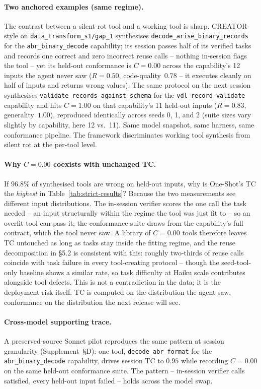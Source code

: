\documentclass[sigconf,anonymous,natbib=false]{acmart}
\begin{document}
\paragraph{Two anchored examples (same regime).}
The contrast between a silent-rot tool and a working tool is sharp. CREATOR-style on \texttt{data\_transform\_s1/gap\_1} synthesises \texttt{decode\_arise\_binary\_records} for the \texttt{abr\_binary\_decode} capability; its session passes half of its verified tasks and records one correct and zero incorrect reuse calls -- nothing in-session flags the tool -- yet its held-out conformance is $C{=}0.00$ across the capability's 12 inputs the agent never saw ($R{=}0.50$, code-quality~$0.78$ -- it executes cleanly on half of inputs and returns wrong values). The same protocol on the next session synthesises \texttt{validate\_records\_against\_schema} for the \texttt{vdl\_record\_validate} capability and hits $C{=}1.00$ on that capability's 11 held-out inputs ($R{=}0.83$, generality~$1.00$), reproduced identically across seeds 0, 1, and 2 (suite sizes vary slightly by capability, here 12 vs.\ 11). Same model snapshot, same harness, same conformance pipeline. The framework discriminates working tool synthesis from silent rot at the per-tool level.

\paragraph{Why $C{=}0.00$ coexists with unchanged TC.}
If $96.8\%$ of synthesised tools are wrong on held-out inputs, why is One-Shot's TC the \emph{highest} in Table~\ref{tab:strict-results}? Because the two measurements see different input distributions. The in-session verifier scores the one call the task needed -- an input structurally within the regime the tool was just fit to -- so an overfit tool can pass it; the conformance suite draws from the capability's full contract, which the tool never saw. A library of $C{=}0.00$ tools therefore leaves TC untouched as long as tasks stay inside the fitting regime, and the reuse decomposition in \S5.2 is consistent with this: roughly two-thirds of reuse calls coincide with task failure in every tool-creating protocol -- though the seed-tool-only baseline shows a similar rate, so task difficulty at Haiku scale contributes alongside tool defects. This is not a contradiction in the data; it is the deployment risk itself. TC is computed on the distribution the agent saw, conformance on the distribution the next release will see.

\paragraph{Cross-model supporting trace.} A preserved-source Sonnet pilot reproduces the same pattern at session granularity (Supplement~\S D): one tool, \texttt{decode\_abr\_format} for the \texttt{abr\_binary\_decode} capability, drives session TC to $0.95$ while recording $C{=}0.00$ on the same held-out conformance suite. The pattern -- in-session verifier calls satisfied, every held-out input failed -- holds across the model swap.
\end{document}
